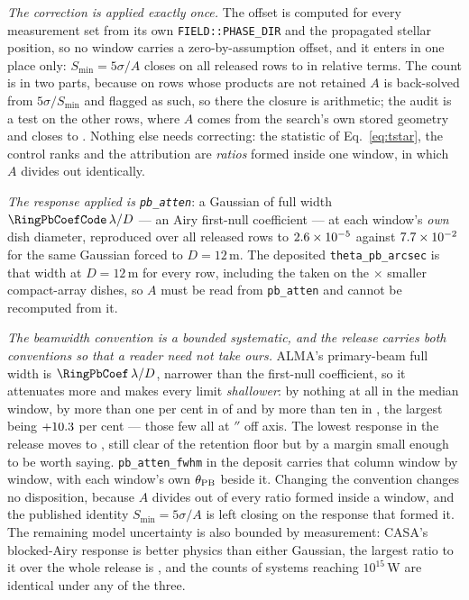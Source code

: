 \emph{The correction is applied exactly once.} The offset is computed for
every measurement set from its own \texttt{FIELD::PHASE\_DIR} and the
propagated stellar position, so no window carries a zero-by-assumption
offset, and it enters in one place only: $S_{\min}=5\sigma/A$ closes on all
\PbSminClosed{} released rows to \PbSminWorstRes{} in relative terms. The
count is in two parts, because on \PbSminTaut{} rows whose products are not
retained $A$ is back-solved from $5\sigma/S_{\min}$ and flagged as such, so
there the closure is arithmetic; the audit is a test on the other
\PbSminIndep{} rows, where $A$ comes from the search's own stored geometry and
closes to \PbSminIndepRes. Nothing else needs correcting: the statistic of
Eq.~\ref{eq:tstar}, the control ranks and the attribution are \emph{ratios}
formed inside one window, in which $A$ divides out identically.

\emph{The response applied is \texttt{pb\_atten}}: a Gaussian of full width
$\RingPbCoefCode\,\lambda/D$ --- an Airy first-null coefficient --- at each
window's \emph{own} dish diameter, reproduced over all \NWindows{} released
rows to $2.6\times10^{-5}$ against $7.7\times10^{-2}$ for the same Gaussian
forced to $D=12$\,m. The deposited \texttt{theta\_pb\_arcsec} is that width
at $D=12$\,m for every row, including the \PbNAcaRow{} taken on the
\PbAcaRatio$\times$ smaller compact-array dishes, so $A$ must be read from
\texttt{pb\_atten} and cannot be recomputed from it.

\emph{The beamwidth convention is a bounded systematic, and the release
carries both conventions so that a reader need not take ours.} ALMA's
primary-beam full width is $\RingPbCoef\,\lambda/D$, narrower than the
first-null coefficient, so it attenuates more and makes every limit
\emph{shallower}: by nothing at all in the median window, by more than one
per cent in \SensPbNOnePct{} of \NWindows{} and by more than ten in
\SensPbNTenPct, the largest being $+10.3$ per cent --- those
few all \SensPbWorstStar{} at \SensPbWorstOff$''$ off axis. The lowest
response in the release moves \SensPbAMin{} to \SensPbAMinAlma, still clear
of the \SensPbFloor{} retention floor but by a margin small enough to be
worth saying. \texttt{pb\_atten\_fwhm} in the deposit carries that column
window by window, with each window's own $\theta_{\rm PB}$ beside it.
Changing the convention changes no disposition, because $A$ divides out of
every ratio formed inside a window, and the published identity
$S_{\min}=5\sigma/A$ is left closing on the response that formed it. The
remaining model uncertainty is also bounded by measurement: CASA's
blocked-Airy response is better physics than either Gaussian, the largest
ratio to it over the whole release is \PbModelMax, and the counts of systems
reaching $10^{15}$\,W are identical under any of the three.

